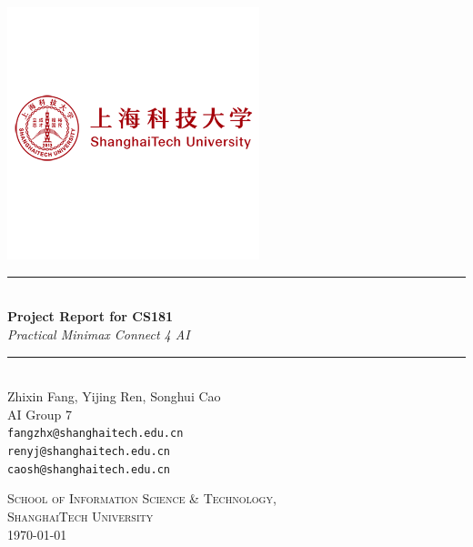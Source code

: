 \documentclass[12pt,a4paper]{article}
\newcommand{\HRule}{\rule{\linewidth}{0.5mm}}
\begin{document}
	
	\begin{titlepage}
		\begin{center}
			
			\includegraphics[width=0.55\textwidth]{Shanghaitech.png}~\\[2cm]
			
			\HRule \\[0.4cm]
			{ \LARGE 
				\textbf{Project Report for CS181}\\[0.4cm]
				\emph{Practical Minimax Connect 4 AI}\\[0.4cm]
			}
			\HRule \\[1.5cm]
			
			
			
			{ \large
				Zhixin Fang, Yijing Ren, Songhui Cao \\[0.1cm]
				AI Group 7\\[0.1cm]
				\texttt{fangzhx@shanghaitech.edu.cn}\\
				\texttt{renyj@shanghaitech.edu.cn}\\
				\texttt{caosh@shanghaitech.edu.cn}\\
			}
			
			\vfill
			
			\textsc{\large School of Information Science \& Technology,\\
			ShanghaiTech University}\\[0.4cm]
			
			
			{\large \today}
			
		\end{center}
	\end{titlepage}
	
\end{document}
